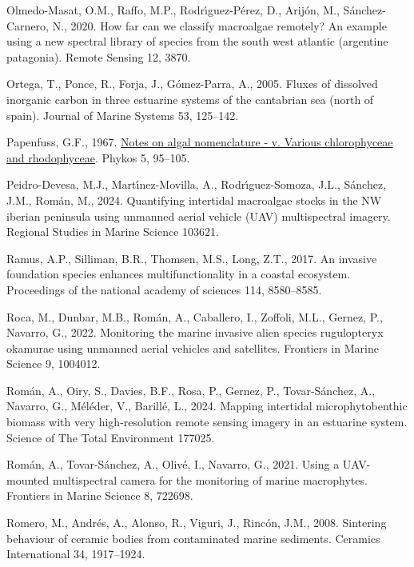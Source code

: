 \documentclass[
  letterpaper,
  DIV=11,
  numbers=noendperiod]{scrartcl}
\newlength{\cslhangindent}
\newenvironment{CSLReferences}[2] %
 {\begin{list}{}{%
  \setlength{\itemindent}{0pt}
  \setlength{\leftmargin}{0pt}
  \setlength{\parsep}{0pt}
  \ifodd #1
   \setlength{\leftmargin}{\cslhangindent}
   \setlength{\itemindent}{-1\cslhangindent}
  \fi
  \setlength{\itemsep}{#2\baselineskip}}}
 {\end{list}}
\begin{document}
\begin{CSLReferences}{1}{0}
Olmedo-Masat, O.M., Raffo, M.P., Rodrı́guez-Pérez, D., Arijón, M.,
Sánchez-Carnero, N., 2020. How far can we classify macroalgae remotely?
An example using a new spectral library of species from the south west
atlantic (argentine patagonia). Remote Sensing 12, 3870.

Ortega, T., Ponce, R., Forja, J., Gómez-Parra, A., 2005. Fluxes of
dissolved inorganic carbon in three estuarine systems of the cantabrian
sea (north of spain). Journal of Marine Systems 53, 125--142.

Papenfuss, G.F., 1967.
\href{https://marinespecies.org/aphia.php?p=sourcedetails&id=303450}{Notes
on algal nomenclature - v. Various chlorophyceae and rhodophyceae}.
Phykos 5, 95--105.

Peidro-Devesa, M.J., Martı́nez-Movilla, A., Rodrı́guez-Somoza, J.L.,
Sánchez, J.M., Román, M., 2024. Quantifying intertidal macroalgae stocks
in the NW iberian peninsula using unmanned aerial vehicle (UAV)
multispectral imagery. Regional Studies in Marine Science 103621.

Ramus, A.P., Silliman, B.R., Thomsen, M.S., Long, Z.T., 2017. An
invasive foundation species enhances multifunctionality in a coastal
ecosystem. Proceedings of the national academy of sciences 114,
8580--8585.

Roca, M., Dunbar, M.B., Román, A., Caballero, I., Zoffoli, M.L., Gernez,
P., Navarro, G., 2022. Monitoring the marine invasive alien species
rugulopteryx okamurae using unmanned aerial vehicles and satellites.
Frontiers in Marine Science 9, 1004012.

Román, A., Oiry, S., Davies, B.F., Rosa, P., Gernez, P., Tovar-Sánchez,
A., Navarro, G., Méléder, V., Barillé, L., 2024. Mapping intertidal
microphytobenthic biomass with very high-resolution remote sensing
imagery in an estuarine system. Science of The Total Environment 177025.

Román, A., Tovar-Sánchez, A., Olivé, I., Navarro, G., 2021. Using a
UAV-mounted multispectral camera for the monitoring of marine
macrophytes. Frontiers in Marine Science 8, 722698.

Romero, M., Andrés, A., Alonso, R., Viguri, J., Rincón, J.M., 2008.
Sintering behaviour of ceramic bodies from contaminated marine
sediments. Ceramics International 34, 1917--1924.


\end{CSLReferences}
\end{document}
